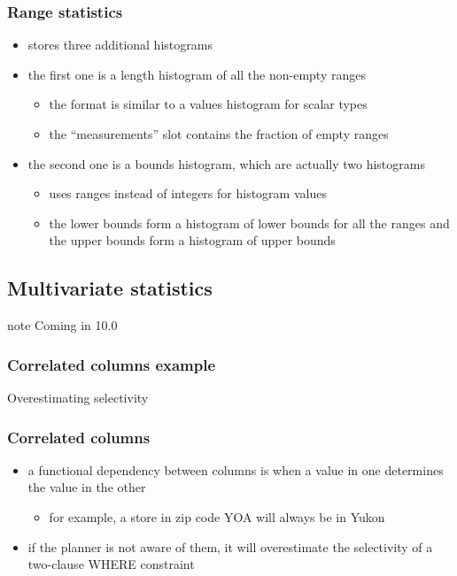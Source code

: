 \documentclass{beamer}
\begin{document}
\begin{frame}
  \frametitle{Range statistics}

  \begin{itemize}
  \item stores \alert{three} additional histograms
  \item the first one is a \alert{length histogram} of all the non-empty ranges
    \begin{itemize}
    \item the format is similar to a values histogram for scalar types
    \item the ``measurements'' slot contains the fraction of empty ranges
    \end{itemize}
  \item the second one is a \alert{bounds histogram}, which are actually two
    histograms
    \begin{itemize}
    \item uses ranges instead of integers for histogram values
    \item the \alert{lower bounds} form a histogram of \alert{lower bounds} for
      all the ranges and the \alert{upper bounds} form a histogram of
      \alert{upper bounds}
    \end{itemize}
  \end{itemize}
\end{frame}

\subsection{Multivariate statistics}

\begin{frame}
\begin{beamercolorbox}[center]{note}
  \Huge Coming in 10.0
\end{beamercolorbox}
\end{frame}

\begin{frame}
  \frametitle{Correlated columns example}

  \begin{block}{Overestimating selectivity}
    
  \end{block}
\end{frame}

\begin{frame}
  \frametitle{Correlated columns}

  \begin{itemize}
  \item a \alert{functional dependency} between columns is when a value in one
    \alert{determines} the value in the other
    \begin{itemize}
    \item for example, a store in zip code YOA will \alert{always} be in Yukon
    \end{itemize}
  \item if the planner is not aware of them, it will \alert{overestimate} the
    selectivity of a two-clause WHERE constraint
  \end{itemize}
\end{frame}
\end{document}
